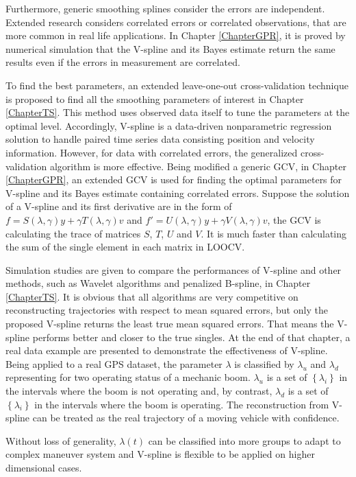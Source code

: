 Furthermore, generic smoothing splines consider the errors are independent. Extended research considers correlated errors or correlated observations, that are more common in real life applications. In Chapter \ref{ChapterGPR}, it is proved by numerical simulation that the V-spline and its Bayes estimate return the same results even if the errors in measurement are correlated. 

To find the best parameters, an extended leave-one-out cross-validation technique is proposed to find all the smoothing parameters of interest in Chapter \ref{ChapterTS}. This method uses  observed data itself to tune the parameters at the optimal level. Accordingly, V-spline is a data-driven nonparametric regression solution to handle paired time series data consisting position and velocity information. However, for data with correlated errors, the generalized cross-validation algorithm is more effective. Being modified a generic GCV, in Chapter \ref{ChapterGPR}, an extended GCV is used for finding the optimal parameters for V-spline and its Bayes estimate containing correlated errors. Suppose the solution of a V-spline and its first derivative are in the form of $f=S(\lambda,\gamma)y+\gamma T(\lambda,\gamma)v$ and $f'=U(\lambda,\gamma)y+\gamma V(\lambda,\gamma)v$, the GCV is calculating the trace of matrices $S$, $T$, $U$ and $V$. It is much faster than calculating the sum of the single element in each matrix in LOOCV. 

Simulation studies are given to compare the performances of V-spline and other methods, such as Wavelet algorithms and penalized B-spline, in Chapter \ref{ChapterTS}. It is obvious that all algorithms are very competitive on reconstructing trajectories with respect to mean squared errors, but only the proposed V-spline returns the least true mean squared errors. That means the V-spline performs better and closer to the true singles. At the end of that chapter, a real data example are presented to demonstrate the effectiveness of V-spline. Being applied to a real GPS dataset, the parameter $\lambda$ is classified by $\lambda_u$ and $\lambda_d$ representing for two operating status of a mechanic boom. $\lambda_u$ is a set of $\left\lbrace\lambda_i\right\rbrace$ in the intervals where the boom is not operating and, by contrast, $\lambda_d$ is a set of $\left\lbrace\lambda_i\right\rbrace$ in the intervals where the boom is operating. The reconstruction from V-spline can be treated as the real trajectory of a moving vehicle with confidence. 

Without loss of generality, $\lambda(t)$ can be classified into more groups to adapt to complex maneuver system and V-spline is flexible to be applied on higher dimensional cases. 

